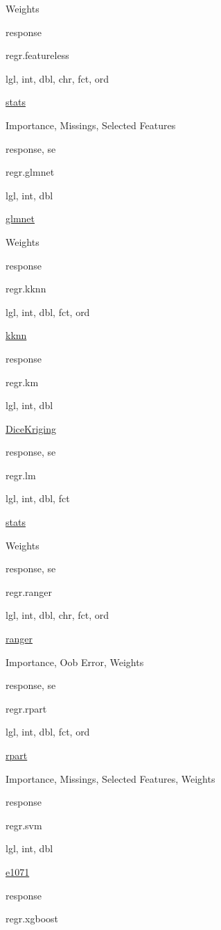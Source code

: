 \documentclass[]{article}
\begin{document}
Weights

response

regr.featureless

lgl, int, dbl, chr, fct, ord

\href{https://cran.r-project.org/package=stats}{stats}

Importance, Missings, Selected Features

response, se

regr.glmnet

lgl, int, dbl

\href{https://cran.r-project.org/package=glmnet}{glmnet}

Weights

response

regr.kknn

lgl, int, dbl, fct, ord

\href{https://cran.r-project.org/package=kknn}{kknn}

response

regr.km

lgl, int, dbl

\href{https://cran.r-project.org/package=DiceKriging}{DiceKriging}

response, se

regr.lm

lgl, int, dbl, fct

\href{https://cran.r-project.org/package=stats}{stats}

Weights

response, se

regr.ranger

lgl, int, dbl, chr, fct, ord

\href{https://cran.r-project.org/package=ranger}{ranger}

Importance, Oob Error, Weights

response, se

regr.rpart

lgl, int, dbl, fct, ord

\href{https://cran.r-project.org/package=rpart}{rpart}

Importance, Missings, Selected Features, Weights

response

regr.svm

lgl, int, dbl

\href{https://cran.r-project.org/package=e1071}{e1071}

response

regr.xgboost
\end{document}
